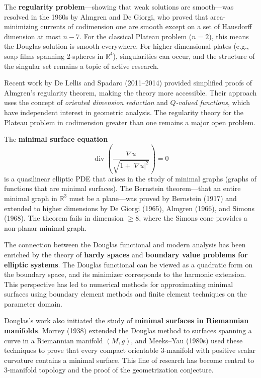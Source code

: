 The \textbf{regularity problem}---showing that weak solutions are
smooth---was resolved in the 1960s by Almgren and De Giorgi, who proved
that area-minimizing currents of codimension one are smooth except on a
set of Hausdorff dimension at most $n-7$. For the classical Plateau
problem ($n=2$), this means the Douglas solution is smooth everywhere.
For higher-dimensional plates (e.g., soap films spanning 2-spheres in
$\mathbb{R}^4$), singularities can occur, and the structure of the
singular set remains a topic of active research.

Recent work by De Lellis and Spadaro (2011--2014) provided simplified
proofs of Almgren's regularity theorem, making the theory more
accessible. Their approach uses the concept of \emph{oriented dimension
reduction} and \emph{$Q$-valued functions}, which have independent
interest in geometric analysis. The regularity theory for the Plateau
problem in codimension greater than one remains a major open problem.

The \textbf{minimal surface equation}
\[
\operatorname{div}\!\left(\frac{\nabla u}{\sqrt{1+|\nabla u|^2}}\right) = 0
\]
is a quasilinear elliptic PDE that arises in the study of minimal
graphs (graphs of functions that are minimal surfaces). The Bernstein
theorem---that an entire minimal graph in $\mathbb{R}^3$ must be a
plane---was proved by Bernstein (1917) and extended to higher dimensions
by De Giorgi (1965), Almgren (1966), and Simons (1968). The theorem
fails in dimension $\geq 8$, where the Simons cone provides a non-planar
minimal graph.

The connection between the Douglas functional and modern analysis has
been enriched by the theory of \textbf{hardy spaces} and \textbf{boundary
value problems for elliptic systems}. The Douglas functional can be
viewed as a quadratic form on the boundary space, and its minimizer
corresponds to the harmonic extension. This perspective has led to
numerical methods for approximating minimal surfaces using boundary
element methods and finite element techniques on the parameter domain.

Douglas's work also initiated the study of \textbf{minimal surfaces in
Riemannian manifolds}. Morrey (1938) extended the Douglas method to
surfaces spanning a curve in a Riemannian manifold $(M,g)$, and
Meeks--Yau (1980s) used these techniques to prove that every compact
orientable 3-manifold with positive scalar curvature contains a minimal
surface. This line of research has become central to 3-manifold
topology and the proof of the geometrization conjecture.

